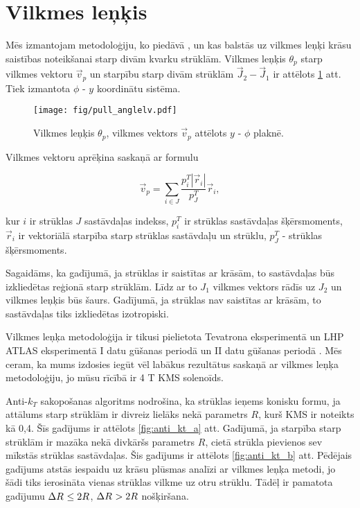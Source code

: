 \section{Vilkmes leņķis}

Mēs izmantojam metodoloģiju, ko piedāvā \cite{Gallicchio:2010sw}, un kas balstās uz vilkmes leņķi krāsu saistības noteikšanai starp divām kvarku strūklām. Vilkmes leņķis $\theta_{p}$ starp vilkmes vektoru $\vec{v}_{p}$ un starpību starp divām strūklām $\vec{J}_{2}-\vec{J}_{1}$ ir attēlots \ref{fig:pull_angle} att. Tiek izmantota $\phi$ - $y$ koordinātu sistēma. 

\begin{figure}[hbtp]
  \centering
  \texttt{[image: fig/pull\_anglelv.pdf]}
  \caption{Vilkmes leņķis $\theta_{p}$, vilkmes vektors $\vec{v}_{p}$ attēlots $y$ - $\phi$ plaknē.}
  \label{fig:pull_angle}
\end{figure}

Vilkmes vektoru aprēķina saskaņā ar formulu

\begin{equation}
  \vec{v}_{p}=\sum_{i\in J}\frac{p^{T}_{i}|\vec{r}_{i}|}{p^{T}_{J}}\vec{r}_{i},
  \label{Eq:pull_angle}
\end{equation}

kur $i$ ir strūklas $J$ sastāvdaļas indekss, $p^{T}_{i}$ ir strūklas sastāvdaļas šķērsmoments, $\vec{r}_{i}$ ir vektoriālā starpība starp strūklas sastāvdaļu un strūklu, $p^{T}_{J}$ - strūklas šķērsmoments.

Sagaidāms, ka gadījumā, ja strūklas ir saistītas ar krāsām, to sastāvdaļas būs izkliedētas reģionā starp strūklām. Līdz ar to $J_{1}$ vilkmes vektors rādīs uz $J_{2}$ un vilkmes leņķis būs šaurs. Gadījumā, ja strūklas nav saistītas ar krāsām, to sastāvdaļas tiks izkliedētas izotropiski.

Vilkmes leņķa metodoloģija ir tikusi pielietota Tevatrona \DZERO eksperimentā\cite{Abazov:2011vh} un LHP ATLAS eksperimentā I datu gūšanas periodā \cite{Aad:2015lxa} un II datu gūšanas periodā \cite{ATLAS:2017iaz}. Mēs ceram, ka mums izdosies iegūt vēl labākus rezultātus saskaņā ar vilkmes leņķa metodoloģiju, jo mūsu rīcībā ir 4 T KMS solenoīds.

Anti-$k_{T}$ \gls{sakopošanas} algoritms nodrošina, ka strūklas ieņems konisku formu, ja attālums starp strūklām \DeltaR ir divreiz lielāks nekā parametrs $R$, kurš KMS ir noteikts kā 0,4. Šīs gadījums ir attēlots \ref{fig:anti_kt_a} att. Gadījumā, ja starpība starp strūklām \DeltaR ir mazāka nekā divkāršs parametrs $R$, \gls{cietā} strūkla pievienos sev mīkstās strūklas sastāvdaļas. Šis gadījums ir attēlots \ref{fig:anti_kt_b} att. Pēdējais gadījums atstās iespaidu uz krāsu plūsmas analīzi ar vilkmes leņķa metodi, jo šādi tiks ierosināta vienas strūklas vilkme uz otru strūklu. Tādēļ ir pamatota gadījumu $\Delta R^{}\leq2R$, $\Delta R^{}>2R$ nošķiršana. 


